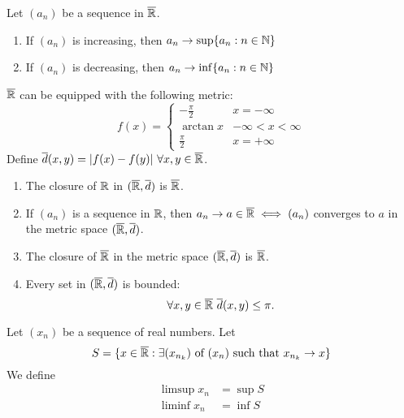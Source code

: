 \begin{theorem}
    Let $(a_n)$ be a sequence in $\overline{\mathbb{R}}$.
    \begin{enumerate}[$(i)$]
        \item If $(a_n)$ is increasing, then $a_n \to \sup\{a_n : n \in \mathbb{N} \}$
        \item If $(a_n)$ is decreasing, then $a_n \to \inf\{a_n : n \in \mathbb{N} \}$
    \end{enumerate}
\end{theorem}

\begin{remark}
    $\overline{\mathbb{R}}$ can be equipped with the following metric:
    $$f(x)=
    \begin{cases}
        -\frac{\pi}{2} &x=-\infty \\
        \arctan{x} &-\infty < x < \infty \\
        \frac{\pi}{2} &x=+\infty
    \end{cases}
    $$
    Define $\overline{d}(x,y)=|f(x) - f(y)| ~\forall x,y \in \overline{\mathbb{R}}$.
    \begin{enumerate}[1)]
        \item The closure of $\mathbb{R}$ in $(\overline{\mathbb{R}}, \overline{d})$ is $\overline{\mathbb{R}}$.
        \item If $(a_n)$ is a sequence in $\mathbb{R}$, then $a_n \to a \in \overline{\mathbb{R}} \iff (a_n)$ converges to $a$ in the metric space $(\overline{\mathbb{R}}, \overline{d})$.
        \item The closure of $\overline{\mathbb{R}}$ in the metric space $(\overline{\mathbb{R}}, \overline{d})$ is $\overline{\mathbb{R}}$.
        \item Every set in $(\overline{\mathbb{R}}, \overline{d})$ is bounded: $$\forall x,y \in \overline{\mathbb{R}} ~\overline{d}(x,y) \leq \pi.$$
    \end{enumerate}
\end{remark}

\begin{definition}
    \label{limsup1}
    Let $(x_n)$ be a sequence of real numbers. Let
    $$ S=\{x\in \overline{\mathbb{R}} : \text{$\exists (x_{n_k})$ of $(x_n) \text{ such that } x_{n_k} \to x$}\}$$
    We define
    \begin{align*}
        \limsup x_n &= \sup S \\
        \liminf x_n &= \inf S
    \end{align*}
\end{definition}

